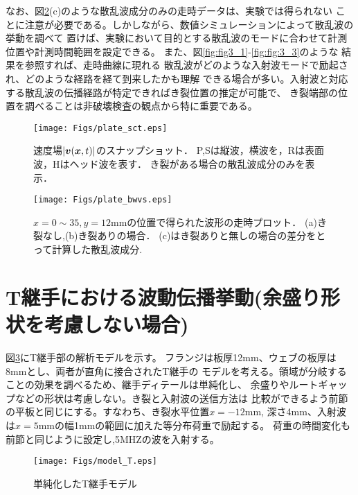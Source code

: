 なお、図\ref{fig:fig3_4}(c)のような散乱波成分のみの走時データは、実験では得られない
ことに注意が必要である。しかしながら、数値シミュレーションによって散乱波の挙動を調べて
置けば、実験において目的とする散乱波のモードに合わせて計測位置や計測時間範囲を設定できる。
また、図\ref{fig:fig3_1}-\ref{fig:fig:3_3}のような 結果を参照すれば、走時曲線に現れる
散乱波がどのような入射波モードで励起され、どのような経路を経て到来したかも理解
できる場合が多い。入射波と対応する散乱波の伝播経路が特定できればき裂位置の推定が可能で、
き裂端部の位置を調べることは非破壊検査の観点から特に重要である。
\begin{figure}[h]
	\begin{center}
	\texttt{[image: Figs/plate\_sct.eps]} 
	\end{center}
	\caption{
		速度場$|\mbox{\boldmath $v$}(\mbox{\boldmath $x$},t)|$のスナップショット．
		P,Sは縦波，横波を，Rは表面波，Hはヘッド波を表す．
		き裂がある場合の散乱波成分のみを表示．
	} 
	\label{fig:fig3_3}
\end{figure}
\begin{figure}[h]
	\begin{center}
	\texttt{[image: Figs/plate\_bwvs.eps]} 
	\end{center}
	\caption{
		$x=0\sim35, y=12$mmの位置で得られた波形の走時プロット．
		(a)き裂なし,(b)き裂ありの場合．
		(c)はき裂ありと無しの場合の差分をとって計算した散乱波成分.
	} 
	\label{fig:fig3_4}
\end{figure}
\section{T継手における波動伝播挙動(余盛り形状を考慮しない場合)}
図\ref{fig:fig3_01}にT継手部の解析モデルを示す。
フランジは板厚12mm、ウェブの板厚は8mmとし、両者が直角に接合されたT継手の
モデルを考える。領域が分岐することの効果を調べるため、継手ディテールは単純化し、
余盛りやルートギャップなどの形状は考慮しない。き裂と入射波の送信方法は
比較ができるよう前節の平板と同じにする。すなわち、き裂水平位置$x=-12$mm, 
深さ4mm、入射波は$x=5$mmの幅1mmの範囲に加えた等分布荷重で励起する。
荷重の時間変化も前節と同じように設定し,5MHZの波を入射する。
\begin{figure}[h]
	\begin{center}
	\texttt{[image: Figs/model\_T.eps]} 
	\end{center}
	\caption{
		単純化したT継手モデル
	} 
	\label{fig:fig3_01}
\end{figure}
